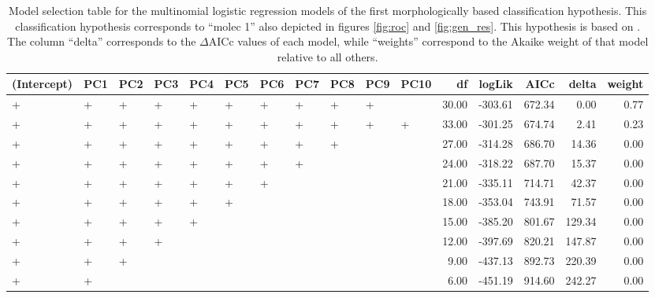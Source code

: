 \documentclass[12pt,letterpaper]{article}\usepackage{graphicx, color}
\begin{document}
\begin{table}
  \centering
{\small
\begin{tabular}{lllllllllllrrrrr}
  \hline
(Intercept) & PC1 & PC2 & PC3 & PC4 & PC5 & PC6 & PC7 & PC8 & PC9 & PC10 & df & logLik & AICc & delta & weight \\ 
  \hline
+ & + & + & + & + & + & + & + & + & + &  & 30.00 & -303.61 & 672.34 & 0.00 & 0.77 \\ 
  + & + & + & + & + & + & + & + & + & + & + & 33.00 & -301.25 & 674.74 & 2.41 & 0.23 \\ 
  + & + & + & + & + & + & + & + & + &  &  & 27.00 & -314.28 & 686.70 & 14.36 & 0.00 \\ 
  + & + & + & + & + & + & + & + &  &  &  & 24.00 & -318.22 & 687.70 & 15.37 & 0.00 \\ 
  + & + & + & + & + & + & + &  &  &  &  & 21.00 & -335.11 & 714.71 & 42.37 & 0.00 \\ 
  + & + & + & + & + & + &  &  &  &  &  & 18.00 & -353.04 & 743.91 & 71.57 & 0.00 \\ 
  + & + & + & + & + &  &  &  &  &  &  & 15.00 & -385.20 & 801.67 & 129.34 & 0.00 \\ 
  + & + & + & + &  &  &  &  &  &  &  & 12.00 & -397.69 & 820.21 & 147.87 & 0.00 \\ 
  + & + & + &  &  &  &  &  &  &  &  & 9.00 & -437.13 & 892.73 & 220.39 & 0.00 \\ 
  + & + &  &  &  &  &  &  &  &  &  & 6.00 & -451.19 & 914.60 & 242.27 & 0.00 \\ 
   \hline
\end{tabular}
}


  \caption{Model selection table for the multinomial logistic regression models of the first morphologically based classification hypothesis. This classification hypothesis corresponds to ``molec 1'' also depicted in figures \ref{fig:roc} and \ref{fig:gen_res}. This hypothesis is based on \citet{Seeliger1945}. The column ``delta'' corresponds to the \(\Delta\)AICc values of each model, while ``weights'' correspond to the Akaike weight of that model relative to all others.}
  \label{tab:mod_sel_3}
\end{table}
\end{document}
